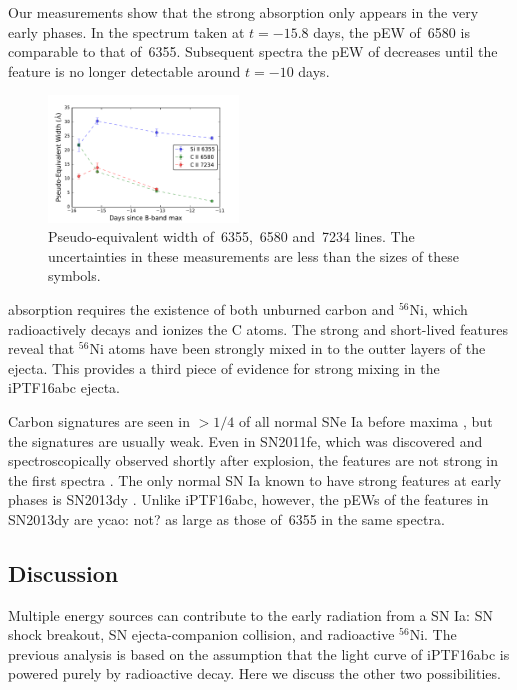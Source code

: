\documentclass[twocolumn]{aastex61}
\newcommand{\ycao}[1]{{\color{red} ycao: {#1}}}
\begin{document}
Our measurements show that the strong  absorption
only appears in the very early phases. In the spectrum taken at
$t=-15.8$ days, the pEW of \,6580 is comparable to that
of \,6355. Subsequent spectra the pEW of  
decreases until the feature is no longer detectable 
around $t=-10$ days. 

\begin{figure}[!htb]
  \centering
  \includegraphics[width=0.45\textwidth]{pEW.pdf}
  \caption{Pseudo-equivalent width of \,6355,
    \,6580 and \,7234 lines. The uncertainties
    in these measurements are less than the sizes of these symbols.}
  \label{fig:ew}
\end{figure}

 absorption requires the existence of both unburned
carbon and $^{56}$Ni, which radioactively decays and ionizes the C 
atoms. The strong and short-lived  features reveal 
that $^{56}$Ni atoms have been strongly mixed in to the outter 
layers of the ejecta. This provides a third piece of evidence
for strong mixing in the iPTF16abc ejecta. 

Carbon signatures are seen in $> 1/4$ of all normal SNe Ia before
maxima
\citep{2011ApJ...732...30P,2012MNRAS.425.1917S,2011ApJ...743...27T},
but the signatures are usually weak. Even in SN2011fe, which was discovered and spectroscopically observed shortly after explosion, the 
features are not strong in the first spectra
\citep{2012ApJ...752L..26P}.  The only normal SN Ia known to have
strong  features at early phases is SN2013dy
\citep{2013ApJ...778L..15Z}. Unlike iPTF16abc, however, the pEWs 
of the  features in SN2013dy are \ycao{not?} as large as 
those of \,6355 in the same spectra.


\subsection{Discussion}
\label{sec:lc_energy}

Multiple energy sources can contribute to the early radiation from a SN Ia: SN shock
breakout, SN ejecta-companion collision, and radioactive 
$^{56}$Ni. The previous analysis is based on the assumption that the light curve of
iPTF16abc is powered purely by radioactive decay. Here we discuss the
other two possibilities.
\end{document}
